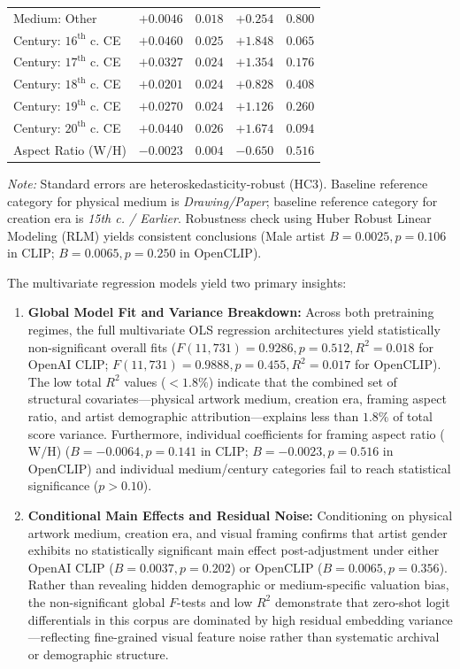 \documentclass[pdflatex,sn-mathphys-num]{sn-jnl}%
\theoremstyle{thmstyleone}%
\theoremstyle{thmstyletwo}%
\theoremstyle{thmstylethree}%
\begin{document}
\begin{table}[h]
\begin{tabular}{lrrrr}
Medium: Other & $+0.0046$ & $0.018$ & $+0.254$ & $0.800$ \\
Century: $16^{\text{th}}$ c. CE & $+0.0460$ & $0.025$ & $+1.848$ & $0.065$ \\
Century: $17^{\text{th}}$ c. CE & $+0.0327$ & $0.024$ & $+1.354$ & $0.176$ \\
Century: $18^{\text{th}}$ c. CE & $+0.0201$ & $0.024$ & $+0.828$ & $0.408$ \\
Century: $19^{\text{th}}$ c. CE & $+0.0270$ & $0.024$ & $+1.126$ & $0.260$ \\
Century: $20^{\text{th}}$ c. CE & $+0.0440$ & $0.026$ & $+1.674$ & $0.094$ \\
Aspect Ratio ($\text{W}/\text{H}$) & $-0.0023$ & $0.004$ & $-0.650$ & $0.516$ \\
\bottomrule
\end{tabular}
\begin{minipage}{\linewidth}
\vspace{0.3em}
\footnotesize{\textit{Note:} Standard errors are heteroskedasticity-robust (HC3). Baseline reference category for physical medium is \textit{Drawing/Paper}; baseline reference category for creation era is \textit{15th c. / Earlier}. Robustness check using Huber Robust Linear Modeling (RLM) yields consistent conclusions (Male artist $B = 0.0025, p = 0.106$ in CLIP; $B = 0.0065, p = 0.250$ in OpenCLIP).}
\end{minipage}
\end{table}

The multivariate regression models yield two primary insights:
\begin{enumerate}
    \item \textbf{Global Model Fit and Variance Breakdown:} Across both pretraining regimes, the full multivariate OLS regression architectures yield statistically non-significant overall fits ($F(11, 731) = 0.9286, p = 0.512, R^2 = 0.018$ for OpenAI CLIP; $F(11, 731) = 0.9888, p = 0.455, R^2 = 0.017$ for OpenCLIP). The low total $R^2$ values ($<1.8\%$) indicate that the combined set of structural covariates—physical artwork medium, creation era, framing aspect ratio, and artist demographic attribution—explains less than $1.8\%$ of total score variance. Furthermore, individual coefficients for framing aspect ratio ($\text{W}/\text{H}$) ($B = -0.0064, p = 0.141$ in CLIP; $B = -0.0023, p = 0.516$ in OpenCLIP) and individual medium/century categories fail to reach statistical significance ($p > 0.10$).
    \item \textbf{Conditional Main Effects and Residual Noise:} Conditioning on physical artwork medium, creation era, and visual framing confirms that artist gender exhibits no statistically significant main effect post-adjustment under either OpenAI CLIP ($B = 0.0037, p = 0.202$) or OpenCLIP ($B = 0.0065, p = 0.356$). Rather than revealing hidden demographic or medium-specific valuation bias, the non-significant global $F$-tests and low $R^2$ demonstrate that zero-shot logit differentials in this corpus are dominated by high residual embedding variance—reflecting fine-grained visual feature noise rather than systematic archival or demographic structure.
\end{enumerate}
\end{document}
